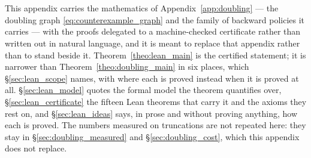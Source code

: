 \section{\appendixItitle}\label{app:lean}

This appendix carries the mathematics of Appendix~\ref{app:doubling} --- the doubling graph
\eqref{eq:counterexample_graph} and the family of backward policies it carries --- with the
proofs delegated to a machine-checked certificate rather than written out in natural language,
and it is meant to replace that appendix rather than to stand beside it.
Theorem~\ref{theo:lean_main} is the certified statement; it is narrower than
Theorem~\ref{theo:doubling_main} in six places, which \S\ref{sec:lean_scope} names, with
where each is proved instead when it is proved at all. \S\ref{sec:lean_model} quotes the formal model the
theorem quantifies over, \S\ref{sec:lean_certificate} the fifteen Lean theorems that carry it
and the axioms they rest on, and \S\ref{sec:lean_ideas} says, in prose and without proving
anything, how each is proved. The numbers measured on truncations are not repeated here: they
stay in \S\ref{sec:doubling_measured} and \S\ref{sec:doubling_cost}, which this appendix does
not replace.

